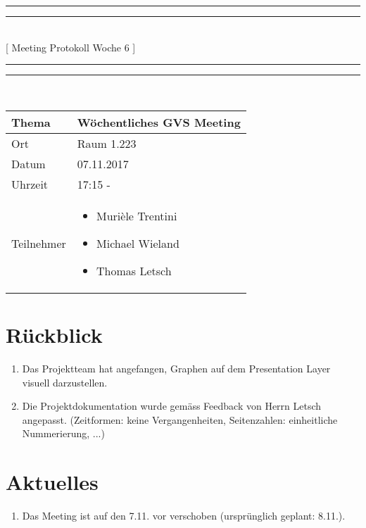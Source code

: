 \documentclass[11pt, a4paper,oneside]{scrartcl}
\begin{document}
\centering
\rule{\textwidth}{1.6pt}\vspace*{-\baselineskip}\vspace*{2pt} %
\rule{\textwidth}{0.4pt}\\[\baselineskip] %
{\LARGE [ Meeting Protokoll Woche 6 ]}\\[0.2\baselineskip] %
\rule{\textwidth}{0.4pt}\vspace*{-\baselineskip}\vspace{3.2pt} %
\rule{\textwidth}{1.6pt}\\[2\baselineskip] %

\begin{tabu} to \linewidth {l X }
	\toprule
	\textbf{Thema} & \textbf{Wöchentliches GVS Meeting} \\
	\midrule
	Ort & Raum 1.223 \\
	Datum & 07.11.2017  \\
	Uhrzeit &  17:15 -  \\
	Teilnehmer & 
	\begin{minipage}[t]{\textwidth}
	  	\begin{itemize}
			\item Murièle Trentini
			\item Michael Wieland
			\item Thomas Letsch
	  	\end{itemize}
	\end{minipage}
	\\
	\bottomrule
\end{tabu}


\section{Rückblick}
\begin{enumerate}
	\item Das Projektteam hat angefangen, Graphen auf dem Presentation Layer visuell darzustellen.
	\item Die Projektdokumentation wurde gemäss Feedback von Herrn Letsch angepasst. (Zeitformen: keine Vergangenheiten, Seitenzahlen: einheitliche Nummerierung, ...)
\end{enumerate}

\section{Aktuelles}
\begin{enumerate}
	\item Das Meeting ist auf den 7.11. vor verschoben (ursprünglich geplant: 8.11.).
\end{enumerate}
\end{document}
